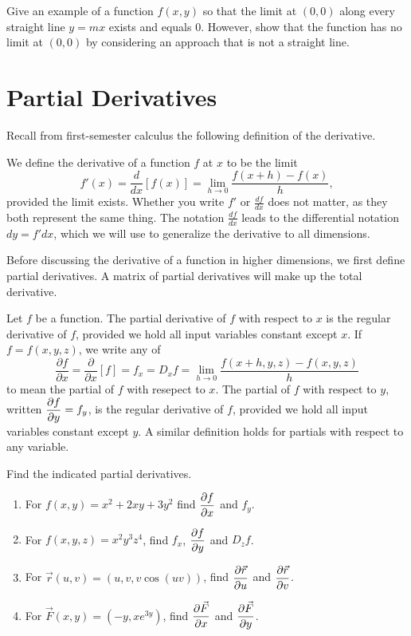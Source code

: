 \begin{problem}[Challenge]
 Give an example of a function $f(x,y)$ so that the limit at $(0,0)$ along every straight line $y=mx$ exists and equals 0.  However, show that the function has no limit at $(0,0)$ by considering an approach that is not a straight line.
\end{problem}


\section{Partial Derivatives}

Recall from first-semester calculus the following definition of the derivative.
\begin{dfn}
We define the derivative of a function $f$ at $x$ to be the limit
$$f'(x)=\frac{d}{dx}[f(x)]=\lim_{h\to 0}\frac{f(x+h)-f(x)}{h},$$
provided the limit exists. Whether you write $f'$ or $\frac{df}{dx}$ does not matter, as they both represent the same thing.  The notation $\frac{df}{dx}$ leads to the differential notation $dy=f'dx$, which we will use to generalize the derivative to all dimensions.
\end{dfn}
Before discussing the derivative of a function in higher dimensions, we first define partial derivatives. A matrix of partial derivatives will make up the total derivative.
\begin{dfn}
 Let $f$ be a function.  The partial derivative of $f$ with respect to $x$ is the regular derivative of $f$, provided we hold all input variables constant except $x$.  If $f=f(x,y,z)$, we write any of 
 $$\frac{\partial f}{\partial x}=\frac{\partial}{\partial x}[f]=f_x = D_x f=\lim_{h\to 0}\frac{f(x+h,y,z)-f(x,y,z)}{h}$$
to mean the partial of $f$ with resepect to $x$.
 The partial of $f$ with respect to $y$, written $\displaystyle \frac{\partial f}{\partial y}=f_y$, is the regular derivative of $f$, provided we hold all input variables constant except $y$. A similar definition holds for partials with respect to any variable.
\end{dfn}

\begin{problem}%
 Find the indicated partial derivatives.
\begin{enumerate}
 \item For $f(x,y)=x^2+2xy+3y^2$ find $\displaystyle\frac{\partial f}{\partial x}$ and $f_y$.
 \item For $f(x,y,z)=x^2y^3z^4$, find $f_x$, $\displaystyle\frac{\partial f}{\partial y}$ and $D_z f$.
 \item For $\vec r(u,v) = (u,v,v\cos(uv))$, find $\displaystyle\frac{\partial \vec r}{\partial u}$ and $\displaystyle\frac{\partial \vec r}{\partial v}$.
 \item For $\vec F(x,y) = (-y,xe^{3y})$, find $\displaystyle\frac{\partial \vec F}{\partial x}$ and $\displaystyle\frac{\partial \vec F}{\partial y}$.
\end{enumerate}
\end{problem}


